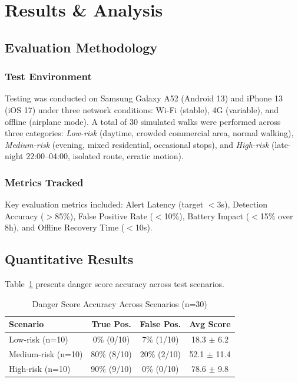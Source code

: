 \section{Results \& Analysis}

\subsection{Evaluation Methodology}

\subsubsection{Test Environment}
Testing was conducted on Samsung Galaxy A52 (Android 13) and iPhone 13 (iOS 17) under three network conditions: Wi-Fi (stable), 4G (variable), and offline (airplane mode). A total of 30 simulated walks were performed across three categories: \textit{Low-risk} (daytime, crowded commercial area, normal walking), \textit{Medium-risk} (evening, mixed residential, occasional stops), and \textit{High-risk} (late-night 22:00--04:00, isolated route, erratic motion).

\subsubsection{Metrics Tracked}
Key evaluation metrics included: Alert Latency (target $<$3s), Detection Accuracy ($>$85\%), False Positive Rate ($<$10\%), Battery Impact ($<$15\% over 8h), and Offline Recovery Time ($<$10s).

\subsection{Quantitative Results}

Table~\ref{tab:danger_accuracy} presents danger score accuracy across test scenarios.

\begin{table}[htbp]
\caption{Danger Score Accuracy Across Scenarios (n=30)}
\label{tab:danger_accuracy}
\centering
\scriptsize
\begin{tabular}{|l|c|c|c|}
\hline
\textbf{Scenario} & \textbf{True Pos.} & \textbf{False Pos.} & \textbf{Avg Score} \\
\hline
Low-risk (n=10) & 0\% (0/10) & 7\% (1/10) & 18.3 $\pm$ 6.2 \\
\hline
Medium-risk (n=10) & 80\% (8/10) & 20\% (2/10) & 52.1 $\pm$ 11.4 \\
\hline
High-risk (n=10) & 90\% (9/10) & 0\% (0/10) & 78.6 $\pm$ 9.8 \\
\hline
\end{tabular}
\end{table}

